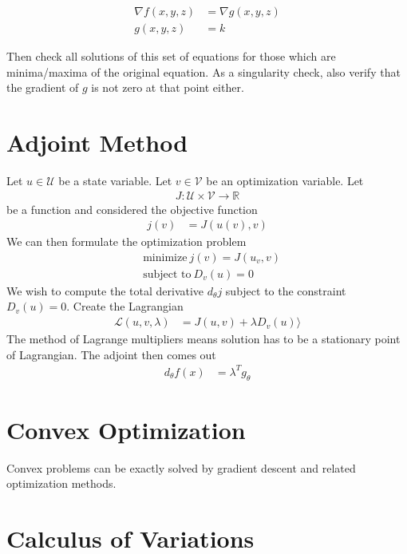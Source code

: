 \documentclass[book.tex]{subfiles}
\begin{document}
\begin{align}
    \nabla f(x, y, z) &= \nabla g(x, y, z) \\
    g(x, y, z) &= k
\end{align}

Then check all solutions of this set of equations for those which are minima/maxima of the original equation. As a singularity check, also verify that the gradient of $g$ is not zero at that point either.

\section{Adjoint Method}

Let $u \in \mathcal{U}$ be a state variable. Let $v \in \mathcal{V}$ be an optimization variable. Let
\begin{align}
J: \mathcal{U} \times \mathcal{V} \to \mathbb{R}
\end{align}
be a function and considered the objective function
\begin{align}
    j(v) &= J(u(v), v)
\end{align}
We can then formulate the optimization problem
\begin{align}
    & \textrm{minimize}\ j(v) = J(u_v, v) \\
    & \textrm{subject to}\ D_v(u) = 0
\end{align}
We wish to compute the total derivative $d_\theta j$ subject to the constraint $D_v(u) = 0$. Create the Lagrangian
\begin{align}
    \mathcal{L}(u, v, \lambda) &= J(u, v) + \lambda D_v(u) \rangle 
\end{align}
The method of Lagrange multipliers means solution has to be a stationary point of Lagrangian. The adjoint then comes out
\begin{align}
d_\theta f(x) &= \lambda^T g_\theta
\end{align}

\section{Convex Optimization}

Convex problems can be exactly solved by gradient descent and related optimization methods.

\section{Calculus of Variations}
\end{document}
